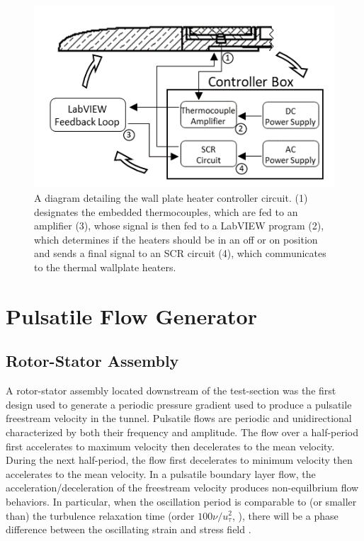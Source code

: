\begin{figure}[h!]
\centering
\includegraphics[scale=1]{figures/facility/circuit_diagram_v2.png}
\caption{{\footnotesize A diagram detailing the wall plate heater controller circuit. (1) designates the embedded thermocouples, which are fed to an amplifier (3), whose signal is then fed to a LabVIEW program (2), which determines if the heaters should be in an off or on position and sends a final signal to an SCR circuit (4), which communicates to the thermal wallplate heaters.
}}
\label{fig:tempcontrol}
\end{figure}

\section{Pulsatile Flow Generator}

\subsection{Rotor-Stator Assembly}
A rotor-stator assembly located downstream of the test-section was the first design used to generate a periodic pressure gradient used to produce a pulsatile freestream velocity in the tunnel. 
Pulsatile flows are periodic and unidirectional characterized by both their frequency and amplitude. 
The flow over a half-period first accelerates to maximum velocity then decelerates to the mean velocity. 
During the next half-period, the flow first decelerates to minimum velocity then accelerates to the mean velocity.
In a pulsatile boundary layer flow, the acceleration/deceleration of the freestream velocity  produces non-equilbrium flow behaviors. 
In particular, when the oscillation period is comparable to (or smaller than) the turbulence relaxation time (order $100 \nu / u_\tau^2$, \cite{Peters1993}), there will be a phase difference between the oscillating strain and stress field \cite{Weng2016}. 

